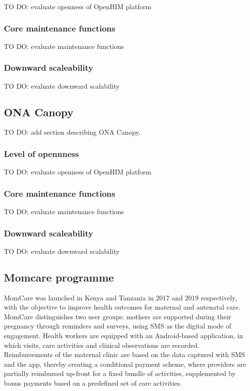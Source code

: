 \documentclass[
  authoryear]{elsarticle}
\begin{document}
TO DO: evaluate openness of OpenHIM platform

\subsubsection{Core maintenance
functions}\label{core-maintenance-functions}

TO DO: evaluate maintenance functions

\subsubsection{Downward scaleability}\label{downward-scaleability}

TO DO: evaluate downward scalability

\subsection{ONA Canopy}\label{ona-canopy}

TO DO: add section describing ONA Canopy.

\subsubsection{Level of opennness}\label{level-of-opennness-1}

TO DO: evaluate openness of OpenHIM platform

\subsubsection{Core maintenance
functions}\label{core-maintenance-functions-1}

TO DO: evaluate maintenance functions

\subsubsection{Downward scaleability}\label{downward-scaleability-1}

TO DO: evaluate downward scalability

\subsection{Momcare programme}\label{momcare-programme}

MomCare was launched in Kenya
\citep{huisman2022digital, sanctis2022maintaining} and Tanzania
\citep{shija2021access, mrema2021application} in 2017 and 2019
respectively, with the objective to improve health outcomes for maternal
and antenatal care. MomCare distinguishes two user groups: mothers are
supported during their pregnancy through reminders and surveys, using
SMS as the digital mode of engagement. Health workers are equipped with
an Android-based application, in which visits, care activities and
clinical observations are recorded. Reimbursements of the maternal
clinic are based on the data captured with SMS and the app, thereby
creating a conditional payment scheme, where providers are partially
reimbursed up-front for a fixed bundle of activities, supplemented by
bonus payments based on a predefined set of care activities.
\end{document}
